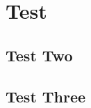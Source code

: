 \documentclass{article}
\begin{document}
	\section{Test}
	
	
	\subsection{Test Two}
	
	
	\subsection{Test Three}
	
	
\end{document}
